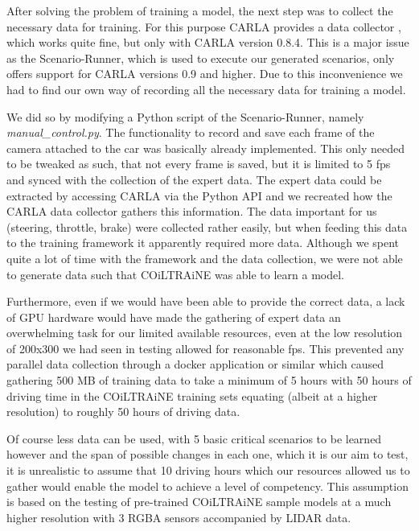 \documentclass[conference, a4paper, 11pt]{IEEEtran}
\begin{document}
After solving the problem of training a model, the next step was to collect the necessary data for training. For this purpose CARLA provides a data collector \cite{CARLA:DataCollector}, which works quite fine, but only with CARLA version 0.8.4. This is a major issue as the Scenario-Runner, which is used to execute our generated scenarios, only  offers support for CARLA versions 0.9 and higher. Due to this inconvenience we had to find our own way of recording all the necessary data for training a model.

We did so by modifying a Python script of the Scenario-Runner, namely \textit{manual\_control.py}. The functionality to record and save each frame of the camera attached to the car was basically already implemented. This only needed to be tweaked as such, that not every frame is saved, but it is limited to 5 fps and synced with the collection of the expert data. The expert data could be extracted by accessing CARLA via the Python API and we recreated how the CARLA data collector gathers this information. The data important for us (steering, throttle, brake) were collected rather easily, but when feeding this data to the training framework it apparently required more data.
Although we spent quite a lot of time with the framework and the data collection, we were not able to generate data such that COiLTRAiNE was able to learn a model.

Furthermore, even if we would have been able to provide the correct data, a lack of GPU hardware would have made the gathering of expert data an overwhelming task for our limited available resources, even at the low resolution of 200x300 we had seen in testing allowed for reasonable fps. This prevented any parallel data collection through a docker application or similar which caused gathering 500 MB of training data to take a minimum of 5 hours with 50 hours of driving time in the COiLTRAiNE training sets equating (albeit at a higher resolution) to roughly 50 hours of driving data.

Of course less data can be used, with 5 basic critical scenarios to be learned however and the span of possible changes in each one, which it is our aim to test, it is unrealistic to assume that 10 driving hours which our resources allowed us to gather would enable the model to achieve a level of competency. This assumption is based on the testing of pre-trained COiLTRAiNE sample models at a much higher resolution with 3 RGBA sensors accompanied by LIDAR data.
\end{document}
